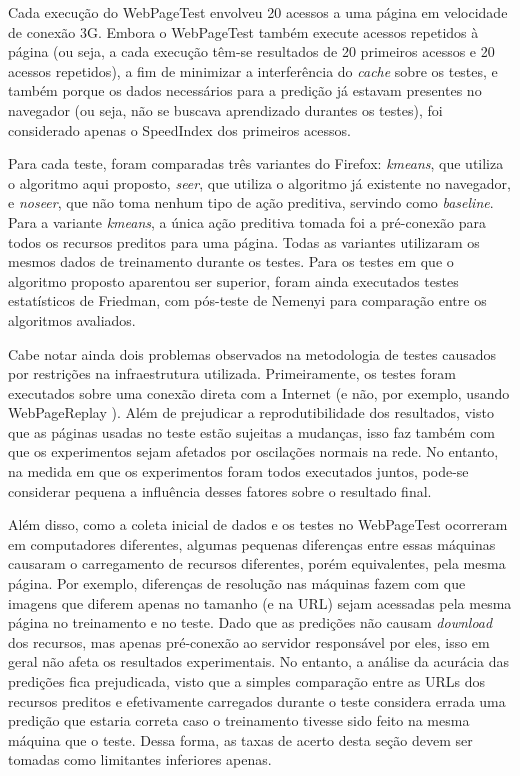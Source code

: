 \documentclass[10pt,twocolumn,letterpaper]{article}
\begin{document}
Cada execução do WebPageTest envolveu 20 acessos a uma página em velocidade de conexão 3G.  Embora o WebPageTest também execute acessos repetidos à página (ou seja, a cada execução têm-se resultados de 20 primeiros acessos e 20 acessos repetidos), a fim de minimizar a interferência do \emph{cache} sobre os testes, e também porque os dados necessários para a predição já estavam presentes no navegador (ou seja, não se buscava aprendizado durantes os testes), foi considerado apenas o SpeedIndex dos primeiros acessos.

Para cada teste, foram comparadas três variantes do Firefox: \emph{kmeans}, que utiliza o algoritmo aqui proposto, \emph{seer}, que utiliza o algoritmo já existente no navegador, e \emph{noseer}, que não toma nenhum tipo de ação preditiva, servindo como \emph{baseline}. Para a variante \emph{kmeans}, a única ação preditiva tomada foi a pré-conexão para todos os recursos preditos para uma página. Todas as variantes utilizaram os mesmos dados de treinamento durante os testes. Para os testes em que o algoritmo proposto aparentou ser superior, foram ainda executados testes estatísticos de Friedman, com pós-teste de Nemenyi para comparação entre os algoritmos avaliados.

Cabe notar ainda dois problemas observados na metodologia de testes causados por restrições na infraestrutura utilizada. Primeiramente, os testes foram executados sobre uma conexão direta com a Internet (e não, por exemplo, usando WebPageReplay \cite{WebPageReplay:2013:Online}). Além de prejudicar a reprodutibilidade dos resultados, visto que as páginas usadas no teste estão sujeitas a mudanças, isso faz também com que os experimentos sejam afetados por oscilações normais na rede. No entanto, na medida em que os experimentos foram todos executados juntos, pode-se considerar pequena a influência desses fatores sobre o resultado final.

Além disso, como a coleta inicial de dados e os testes no WebPageTest ocorreram em computadores diferentes, algumas pequenas diferenças entre essas máquinas causaram o carregamento de recursos diferentes, porém equivalentes, pela mesma página. Por exemplo, diferenças de resolução nas máquinas fazem com que imagens que diferem apenas no tamanho (e na URL) sejam acessadas pela mesma página no treinamento e no teste. Dado que as predições não causam \emph{download} dos recursos, mas apenas pré-conexão ao servidor responsável por eles, isso em geral não afeta os resultados experimentais. No entanto, a análise da acurácia das predições fica prejudicada, visto que a simples comparação entre as URLs dos recursos preditos e efetivamente carregados durante o teste considera errada uma predição que estaria correta caso o treinamento tivesse sido feito na mesma máquina que o teste. Dessa forma, as taxas de acerto desta seção devem ser tomadas como limitantes inferiores apenas.
\end{document}
